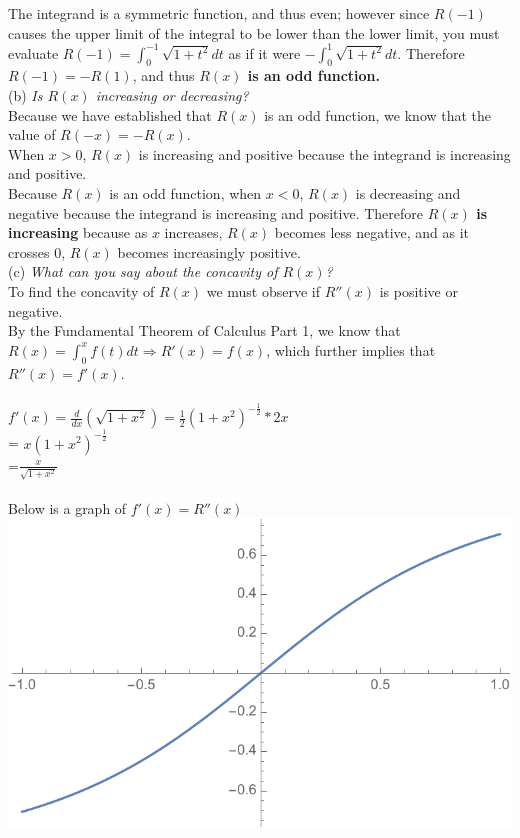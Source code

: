 \documentclass[12pt]{article}
\begin{document}
The integrand is a symmetric function, and thus even; however since $R(-1)$ causes the upper limit of the integral to be lower than the lower limit, you must evaluate $R(-1) = \int_{0}^{-1} \sqrt{1+t^2} dt $ as if it were $-\int_{0}^{1}\sqrt{1+t^2}dt$. Therefore $R(-1) = -R(1)$, and thus \textbf{$R(x)$ is an odd function.}
\\

\noindent (b) \textit{Is $R(x)$ increasing or decreasing?}\\
Because we have established that $R(x)$ is an odd function, we know that the value of $R(-x) = -R(x)$.\\
When $x>0$, $R(x)$ is increasing and positive because the integrand is increasing and positive.\\
Because $R(x)$ is an odd function, when $x<0$, $R(x)$ is decreasing and negative because the integrand is increasing and positive. 
Therefore \textbf{$R(x)$ is increasing} because as $x$ increases, $R(x)$ becomes less negative, and as it crosses 0, $R(x)$ becomes increasingly positive. \\

\noindent (c) \textit{What can you say about the concavity of $R(x)$?}\\
To find the concavity of $R(x)$ we must observe if $R''(x)$ is positive or negative. \\
By the Fundamental Theorem of Calculus Part 1, we know that $R(x) = \int_{0}^{x}f(t)dt \Rightarrow R'(x) = f(x)$, which further implies that $R''(x) = f'(x)$.\\
\\
$f'(x) = \frac{d}{dx}(\sqrt{1+x^2}) = \frac{1}{2}(1+x^2)^{-\frac{1}{2}}*2x$\\
= $x(1+x^2)^{-\frac{1}{2}}$\\
=$\frac{x}{\sqrt{1+x^2}}$ \\~\\
Below is a graph of $f'(x) = R''(x)$\\
\includegraphics[width=.45\textwidth]{c_graph.pdf}
\end{document}
